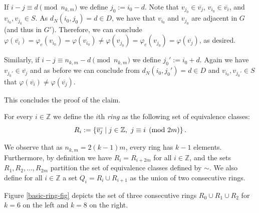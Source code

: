 \documentclass[a4paper,10pt,hidelinks]{amsart}
\renewcommand{\phi}{\ensuremath{\varphi}}
\newenvironment{claimproof}[1][\proofname]{\proof[#1]\renewcommand{\qedsymbol}{$\blacksquare$}}{\endproof}
\newenvironment{subclaimproof}[1][\proofname]{\proof[#1]\renewcommand{\qedsymbol}{$\blacklozenge$}}{\endproof}
\theoremstyle{definition}
\begin{document}
\begin{claimproof}[Proof of Claim~\ref{structure-claim} when $k \in \{6,8\}$]
\begin{subclaimproof}
            If $i - j \equiv d \pmod{n_{k,m}}$  we define $j_0 := i_0 - d$. Note that $v_{j_0} \in \overline{v_{j}}$, $v_{i_0} \in \overline{v_{i}}$, and $v_{i_0}, v_{j_0} \in S$. As $d_N(i_0, j_0) = d \in D$, we have that $v_{i_0}$ and $v_{j_0}$ are adjacent in $G$ (and thus in $G'$). Therefore, we can conclude $\varphi(\overline{v_i}) = \varphi_e(v_{i_0})=\phi(v_{i_0}) \neq \varphi(v_{j_0})=\varphi_e(v_{j_0})=\varphi(\overline{v_j})$, as desired.
            
            Similarly, if $i - j \equiv n_{k,m} - d \pmod{n_{k,m}}$ we define $j_0' := i_0 + d$. Again we have $v_{j_0'} \in \overline{v_{j}}$ and as before we can conclude from $d_N(i_0, j_0') = d \in D$ and $v_{i_0}, v_{j_0'}\in S$ that $\varphi(\overline{v_i}) \neq \varphi(\overline{v_j})$. 

            This concludes the proof of the claim.
        \end{subclaimproof}
        

        For every $i \in \mathbb{Z}$ we define the $i$th \emph{ring} as the following set of equivalence classes:
        \begin{equation}\notag
            R_i := \left\{\overline{v_{j}} \mid j\in\mathbb{Z},\,\, j \equiv i \pmod{2m}  \right\}. 
        \end{equation}

        We observe that as $n_{k,m} = 2(k-1)m$, every ring has $k-1$ elements. Furthermore, by definition we have $R_i = R_{i + 2m}$ for all $i \in \mathbb{Z}$, and the sets $R_1, R_2, \dots, R_{2m}$ partition the set of equivalence classes defined by $\sim$. We also define for all $i \in \mathbb{Z}$ a set $Q_i = R_i \cup R_{i+1}$ as the union of two consecutive rings.

        Figure \ref{basic-ring-fig} depicts the set of three consecutive rings $R_0 \cup R_1 \cup R_2$ for $k = 6$ on the left and $k = 8$ on the right. 

        \begin{figure}[ht]

            \begin{subfigure}{0.4\textwidth}
\end{subfigure}
\end{figure}
\end{claimproof}
\end{document}

